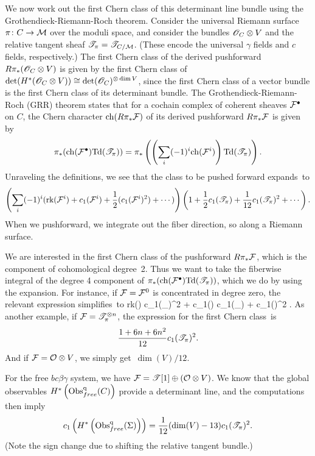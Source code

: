 We now work out the first Chern class of this determinant line bundle using the Grothendieck-Riemann-Roch theorem.
Consider the universal Riemann surface $\pi \colon C \to \mathcal M$ over the moduli space, 
and consider the bundles $\mathscr O_C \otimes V$ and the relative tangent sheaf $\mathscr T_\pi = \mathscr T_{C/\mathcal M}$.
(These encode the universal $\gamma$ fields and $c$ fields, respectively.)
The first Chern class of the derived pushforward $R\pi_*(\mathscr O_C \otimes V)$ is given by the first Chern class of $\det(H^*(\mathscr O_C \otimes V)) \cong \det(\mathscr O_C)^{\otimes \dim V}$, 
since the first Chern class of a vector bundle is the first Chern class of its determinant bundle.
The Grothendieck-Riemann-Roch (GRR) theorem states that for a cochain complex of coherent sheaves $\mathcal F^\bullet$ on $C$, 
the Chern character ${\rm ch}(R\pi_* \mathcal F)$ of its derived pushforward $R\pi_* \mathcal F$  is given by 
\def\Td{{\rm Td}}
\[
\pi_*( \ch(\cF^\bullet)\Td(\sT_\pi)) = \pi_*\left( \left(\sum_{i} (-1)^i \ch (\cF^i) \right) \Td(\sT_\pi)\right).
\]
Unraveling the definitions, we see that the class to be pushed forward expands~to
\[
\left(\sum_i (-1)^i ({\rm rk}(\mathcal F^i) + c_1(\mathcal F^i) + \frac{1}{2}(c_1(\mathcal F^i)^2) + \cdots)\right) \left(1 +\frac{1}{2}c_1(\mathscr T_\pi) + \frac{1}{12} c_1(\mathscr T_\pi)^2 + \cdots \right).
\]
When we pushforward, we integrate out the fiber direction, so along a Riemann surface.

We are interested in the first Chern class of the pushforward $R\pi_* \mathcal F$,
which is the component of cohomological degree~2.
Thus we want to take the fiberwise integral of the degree 4 component of $\pi_*( \ch(\cF^\bullet)\Td(\sT_\pi))$,
which we do by using the expansion.
For instance, if $\mathcal F = \mathcal F^0$ is concentrated in degree zero, the relevant expression simplifies~to
\ben
{} {\rm rk}(\cF) c_1(\sT_\pi)^2 +  c_1(\cF) c_1(\sT_\pi) +  c_1(\cF)^2 .
\een  
As another example, if $\mathcal F = \mathscr T^{\otimes n}_{\pi}$, the expression for the first Chern class~is 
\[
\frac{1 + 6n + 6n^2}{12} c_1(\mathscr T_\pi)^2.
\]
And if $\mathcal F = \mathcal O \otimes V$, we simply get~$\dim(V)/12$. 

For the free $bc\beta\gamma$ system,
we have $\mathcal F = \mathscr T[1] \oplus (\mathcal O \otimes V)$.
We know that the global observables $H^*\left({\rm Obs}^{\rm q}_{free}(C)\right)$ provide a determinant line,
and the computations then imply
\[
c_1\left(H^*\left({\rm Obs}^{\rm q}_{free}(\Sigma)\right)\right) = \frac{1}{12} (\dim(V) - 13) c_1(\mathscr T_\pi)^2 .
\]
(Note the sign change due to shifting the relative tangent bundle.)

